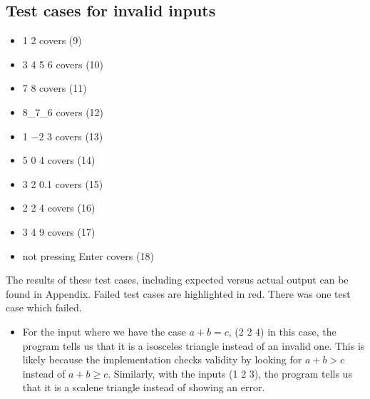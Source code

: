 \documentclass[letterpaper]{article}
\begin{document}
\subsection*{Test cases for invalid inputs}
\begin{itemize}
    \item 1 2 covers (9)
    \item 3 4 5 6 covers (10)
    \item 7 8  covers (11)
    \item 8\_7\_6 covers (12)
    \item 1 $-2$ 3 covers (13)
    \item 5 0 4 covers (14)
    \item 3 2 0.1 covers (15)
    \item 2 2 4 covers (16)
    \item 3 4 9 covers (17)
    \item not pressing Enter covers (18)
\end{itemize}

The results of these test cases, including expected versus actual output can be found in Appendix.
Failed test cases are highlighted in red. There was one test case which failed. 

\begin{itemize}
    \item For the input where we have the case $a+b=c$,
    (2 2 4) in this case, the program tells us that it is a isosceles triangle instead of an invalid one.
    This is likely because the implementation checks validity by looking for $a+b>c$ instead of $a+b \geq c$.    
    Similarly, with the inputs (1 2 3), the program tells us that it is a scalene triangle instead of showing an error.
\end{itemize}
\end{document}
